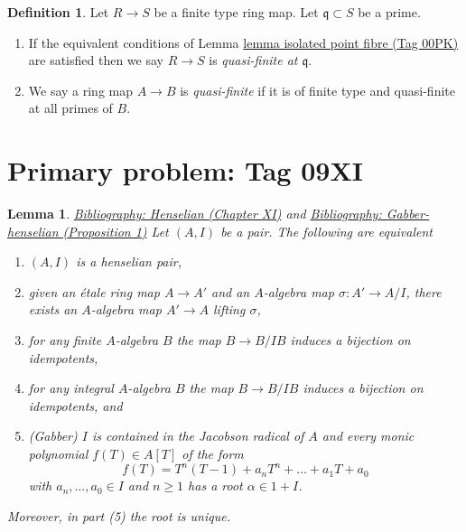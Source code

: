 \documentclass{amsart}
\newenvironment{reference}{\comment}{\endcomment}
\theoremstyle{plain}
\newtheorem{lemma}[subsection]{Lemma}
\theoremstyle{definition}
\newtheorem{definition}[subsection]{Definition}
\theoremstyle{remark}
\numberwithin{equation}{subsection}
\begin{document}
\begin{definition}
\label{algebra-definition-quasi-finite}
Let $R \to S$ be a finite type ring map.
Let $\mathfrak q \subset S$ be a prime.
\begin{enumerate}
\item If the equivalent conditions of Lemma \href{https://stacks.math.columbia.edu/tag/00PK}{lemma isolated point fibre (Tag 00PK)}
are satisfied then we say $R \to S$ is {\it quasi-finite at $\mathfrak q$}.
\item We say a ring map $A \to B$ is {\it quasi-finite}
if it is of finite type and quasi-finite at all primes of $B$.
\end{enumerate}
\end{definition}

\section*{Primary problem: Tag 09XI}
\begin{lemma}
\label{lemma-characterize-henselian-pair}
\begin{reference}
\href{https://stacks.math.columbia.edu/bibliography}{Bibliography: Henselian (Chapter XI)} and \href{https://stacks.math.columbia.edu/bibliography}{Bibliography: Gabber-henselian (Proposition 1)}
\end{reference}
Let $(A, I)$ be a pair. The following are equivalent
\begin{enumerate}
\item $(A, I)$ is a henselian pair,
\item given an \'etale ring map $A \to A'$ and an $A$-algebra map
$\sigma : A' \to A/I$, there exists an $A$-algebra map $A' \to A$
lifting $\sigma$,
\item for any finite $A$-algebra $B$ the map $B \to B/IB$ induces
a bijection on idempotents,
\item for any integral $A$-algebra $B$ the map $B \to B/IB$ induces
a bijection on idempotents, and
\item (Gabber) $I$ is contained in the Jacobson radical of $A$ and
every monic polynomial $f(T) \in A[T]$ of the form
$$
f(T) = T^n(T - 1) + a_n T^n + \ldots + a_1 T + a_0
$$
with $a_n, \ldots, a_0 \in I$ and $n \ge 1$ has a root $\alpha \in 1 + I$.
\end{enumerate}
Moreover, in part (5) the root is unique.
\end{lemma}
\end{document}
